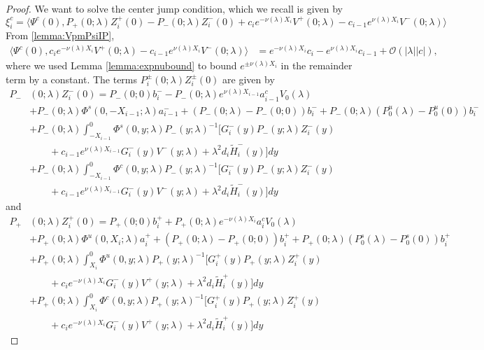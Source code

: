 \documentclass[thesis.tex]{subfiles}
\begin{document}
\begin{lemma}
\begin{proof}
We want to solve the center jump condition, which we recall is given by
\[
\xi_i^c = 
\langle \Psi^c(0), P_+(0; \lambda) Z_i^+(0) - P_-(0; \lambda) Z_i^-(0) + c_i e^{-\nu(\lambda)X_i}V^+(0; \lambda) - c_{i-1} e^{\nu(\lambda)X_i} V^-(0; \lambda) \rangle 
\]
From \cref{lemma:VpmPsiIP},
\begin{align}\label{centerVjump}
\langle \Psi^c(0), c_i e^{-\nu(\lambda)X_i}V^+(0; \lambda) - c_{i-1} e^{\nu(\lambda)X_i} V^-(0; \lambda) \rangle &= e^{-\nu(\lambda)X_i}c_i  - e^{\nu(\lambda)X_i}c_{i-1} + \mathcal{O}(|\lambda| |c| ),
\end{align}
where we used Lemma \ref{lemma:expnubound} to bound $e^{\pm\nu(\lambda)X_i}$ in the remainder term by a constant. The terms $P_i^\pm(0; \lambda) Z_i^\pm(0)$ are given by
\begin{align*}
P_-&(0; \lambda) Z_i^-(0) = P_-(0; 0) b_i^- - P_-(0; \lambda) e^{\nu(\lambda) X_{i-1}} a_{i-1}^c V_0(\lambda) \\
&+ P_-(0; \lambda) \Phi^s(0, -X_{i-1}; \lambda) a_{i-1}^- + (P_-(0; \lambda) - P_-(0; 0))b_i^- + P_-(0; \lambda)(P_0^u(\lambda) - P_0^u(0))b_i^- \\
&+ P_-(0; \lambda) \int_{-X_{i-1}}^0 \Phi^s(0, y; \lambda) P_-(y; \lambda)^{-1} \big[ G_i^-(y) P_-(y; \lambda) Z_i^-(y) \\
&\qquad+ c_{i-1} e^{\nu(\lambda)X_{i-1}} G_i^-(y) V^-(y; \lambda) + \lambda^2 d_i \tilde{H}_i^-(y)\big] dy \\
&+ P_-(0; \lambda) \int_{-X_{i-1}}^0 \Phi^c(0, y; \lambda) P_-(y; \lambda)^{-1} \big[ G_i^-(y) P_-(y; \lambda) Z_i^-(y) \\
&\qquad+ c_{i-1} e^{\nu(\lambda)X_{i-1}} G_i^-(y) V^-(y; \lambda) + \lambda^2 d_i \tilde{H}_i^-(y)\big] dy
\end{align*}
and
\begin{align*}
P_+&(0; \lambda) Z_i^+(0) = P_+(0; 0) b_i^+ + P_+(0; \lambda) e^{-\nu(\lambda)X_i} a_i^c V_0(\lambda) \\
&+ P_+(0; \lambda) \Phi^u(0, X_i; \lambda) a_i^+ + (P_+(0; \lambda) - P_+(0; 0)) b_i^+ + P_+(0; \lambda) (P_0^s(\lambda) - P_0^s(0)) b_i^+ \\
&+ P_+(0; \lambda) \int_{X_i}^0 \Phi^u(0, y; \lambda) P_+(y; \lambda)^{-1} \big[ G_i^+(y) P_+(y; \lambda) Z_i^+(y) \\
&\qquad+ c_i e^{-\nu(\lambda)X_i} G_i^-(y) V^+(y; \lambda) + \lambda^2 d_i \tilde{H}_i^+(y)\big] dy \\
&+ P_+(0; \lambda) \int_{X_i}^0 \Phi^c(0, y; \lambda) P_+(y; \lambda)^{-1} \big[ G_i^+(y) P_+(y; \lambda) Z_i^+(y) \\
&\qquad+ c_i e^{-\nu(\lambda)X_i} G_i^-(y) V^+(y; \lambda) + \lambda^2 d_i \tilde{H}_i^+(y)\big] dy 
\end{align*}


\end{proof}
\end{lemma}
\end{document}
